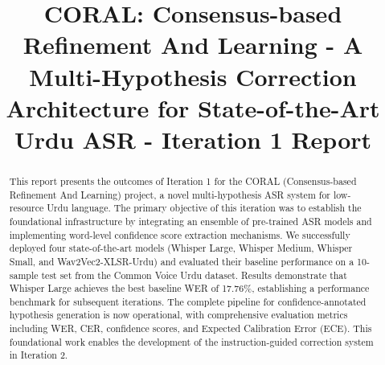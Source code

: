 \documentclass{fast-nuces-bs}
\title{CORAL: Consensus-based Refinement And Learning - A Multi-Hypothesis Correction Architecture for State-of-the-Art Urdu ASR - Iteration 1 Report}
\begin{document}
\begin{abstract}
This report presents the outcomes of Iteration 1 for the CORAL (Consensus-based Refinement And Learning) project, a novel multi-hypothesis ASR system for low-resource Urdu language. The primary objective of this iteration was to establish the foundational infrastructure by integrating an ensemble of pre-trained ASR models and implementing word-level confidence score extraction mechanisms. We successfully deployed four state-of-the-art models (Whisper Large, Whisper Medium, Whisper Small, and Wav2Vec2-XLSR-Urdu) and evaluated their baseline performance on a 10-sample test set from the Common Voice Urdu dataset. Results demonstrate that Whisper Large achieves the best baseline WER of 17.76\%, establishing a performance benchmark for subsequent iterations. The complete pipeline for confidence-annotated hypothesis generation is now operational, with comprehensive evaluation metrics including WER, CER, confidence scores, and Expected Calibration Error (ECE). This foundational work enables the development of the instruction-guided correction system in Iteration 2.
\end{abstract}






 
\end{document}
